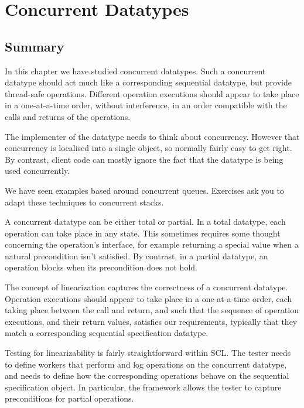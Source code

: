 \chapter{Concurrent Datatypes}
\label{chap:datatypes}



\section{Summary}

In this chapter we have studied concurrent datatypes.  Such a concurrent
datatype should act much like a corresponding sequential datatype, but provide
thread-safe operations.  Different operation executions should appear to take
place in a one-at-a-time order, without interference, in an order compatible
with the calls and returns of the operations.

The implementer of the datatype needs to think about concurrency.  However
that concurrency is localised into a single object, so normally fairly easy to
get right.  By contrast, client code can mostly ignore the fact that the
datatype is being used concurrently.

We have seen examples based around concurrent queues.  Exercises ask you to
adapt these techniques to concurrent stacks.

A concurrent datatype can be either total or partial.  In a total datatype,
each operation can take place in any state.  This sometimes requires some
thought concerning the operation's interface, for example returning a special
value when a natural precondition isn't satisfied.  By contrast, in a partial
datatype, an operation blocks when its precondition does not hold.

The concept of linearization captures the correctness of a concurrent
datatype.  Operation executions should appear to take place in a one-at-a-time
order, each taking place between the call and return, and such that the
sequence of operation executions, and their return values, satisfies our
requirements, typically that they match a corresponding sequential
specification datatype.

Testing for linearizability is fairly straightforward within SCL\@.  The tester
needs to define workers that perform and log operations on the concurrent
datatype, and needs to define how the corresponding operations behave on the
sequential specification object.  In particular, the framework allows the
tester to capture preconditions for partial operations. 

